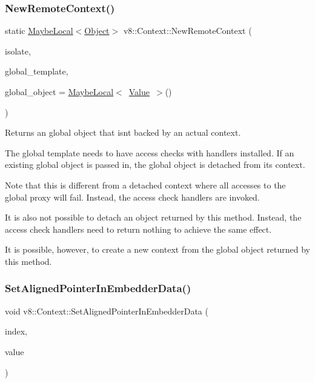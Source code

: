 \subsubsection{\texorpdfstring{New\+Remote\+Context()}{NewRemoteContext()}}
{\footnotesize\ttfamily static \mbox{\hyperlink{classv8_1_1MaybeLocal}{Maybe\+Local}}$<$\mbox{\hyperlink{classv8_1_1Object}{Object}}$>$ v8\+::\+Context\+::\+New\+Remote\+Context (\begin{DoxyParamCaption}\item[{\mbox{\hyperlink{classv8_1_1Isolate}{Isolate}} $\ast$}]{isolate,  }\item[{\mbox{\hyperlink{classv8_1_1Local}{Local}}$<$ \mbox{\hyperlink{classv8_1_1ObjectTemplate}{Object\+Template}} $>$}]{global\+\_\+template,  }\item[{\mbox{\hyperlink{classv8_1_1MaybeLocal}{Maybe\+Local}}$<$ \mbox{\hyperlink{classv8_1_1Value}{Value}} $>$}]{global\+\_\+object = {\ttfamily \mbox{\hyperlink{classv8_1_1MaybeLocal}{Maybe\+Local}}$<$~\mbox{\hyperlink{classv8_1_1Value}{Value}}~$>$()} }\end{DoxyParamCaption})\hspace{0.3cm}{\ttfamily [static]}}

Returns an global object that isn\textquotesingle{}t backed by an actual context.

The global template needs to have access checks with handlers installed. If an existing global object is passed in, the global object is detached from its context.

Note that this is different from a detached context where all accesses to the global proxy will fail. Instead, the access check handlers are invoked.

It is also not possible to detach an object returned by this method. Instead, the access check handlers need to return nothing to achieve the same effect.

It is possible, however, to create a new context from the global object returned by this method. \mbox{\label{classv8_1_1Context_a522063c88e4c2832f5ff4f3980815f58}} 
\subsubsection{\texorpdfstring{Set\+Aligned\+Pointer\+In\+Embedder\+Data()}{SetAlignedPointerInEmbedderData()}}
{\footnotesize\ttfamily void v8\+::\+Context\+::\+Set\+Aligned\+Pointer\+In\+Embedder\+Data (\begin{DoxyParamCaption}\item[{int}]{index,  }\item[{void $\ast$}]{value }\end{DoxyParamCaption})}

